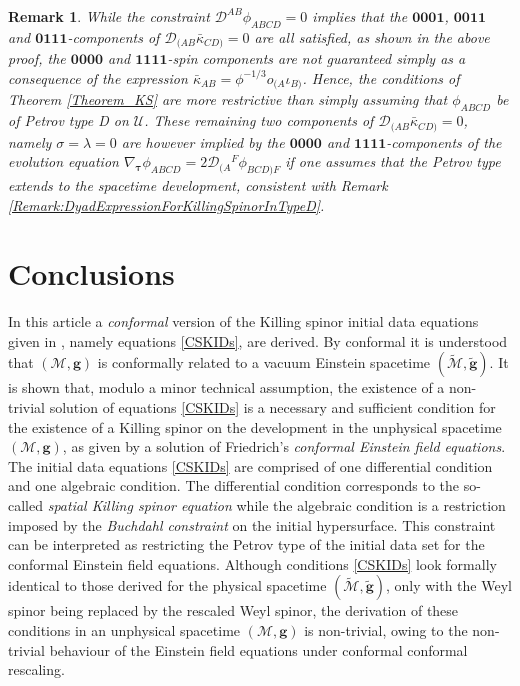 \documentclass[10pt,a4paper]{article}
\theoremstyle{plain}
\newtheorem{remark}{Remark}
\def\bmg{{\bm g}}
\begin{document}
\begin{remark}{\em 
 While the constraint $\mathcal{D}^{AB}\phi_{ABCD}=0$ implies that the
 $\bm0\bm0\bm0\bm1$, $\bm0\bm0\bm1\bm1$ and
 $\bm0\bm1\bm1\bm1$-components of
 $\mathcal{D}_{(AB}\bar{\kappa}_{CD)}=0$ are all satisfied, as shown
 in the above proof, the $\bm0\bm0\bm0\bm0$ and
 $\bm1\bm1\bm1\bm1$-spin components are not guaranteed simply as a
 consequence of the expression
 $\bar{\kappa}_{AB}=\phi^{-1/3}o_{(A}\iota_{B)}$. Hence, the
 conditions of Theorem \ref{Theorem_KS} are more restrictive than
 simply assuming that $\phi_{ABCD}$ be of Petrov type D on
 $\mathcal{U}$. These remaining two components of
 $\mathcal{D}_{(AB}\bar{\kappa}_{CD)}=0$, namely $\sigma=\lambda=0$ are however implied by the
 $\bm0\bm0\bm0\bm0$ and $\bm1\bm1\bm1\bm1$-components of the
 \emph{evolution equation}
 $\nabla_{\bm\tau}\phi_{ABCD}=2\mathcal{D}_{(A}{}^F\phi_{BCD)F}$ if
 one \emph{assumes} that the Petrov type extends to the spacetime
 development, consistent with Remark
 \ref{Remark:DyadExpressionForKillingSpinorInTypeD}.}
\end{remark}


\section*{Conclusions}

In this article a \emph{conformal} version of the Killing spinor
initial data equations given in \cite{GarVal08c}, namely equations \eqref{CSKIDs}, are derived. By
conformal it is understood that $(\mathcal{M},\bmg)$ is conformally
related to a vacuum Einstein spacetime $(\tilde{\mathcal{M}},\tilde{\bmg})$.
It is shown that, modulo a minor technical assumption, the existence of a non-trivial solution of equations
\eqref{CSKIDs} is a necessary and sufficient
condition for the existence of a Killing spinor on the development in
the unphysical spacetime $(\mathcal{M},\bmg)$, as given by a solution of Friedrich's
\emph{conformal Einstein field equations}.
  The initial data equations \eqref{CSKIDs} are comprised of one differential condition and one
  algebraic condition.  The differential condition corresponds to the
  so-called \emph{spatial Killing spinor equation} while the algebraic
  condition is a restriction imposed by the \emph{Buchdahl constraint} on the initial
  hypersurface. This constraint can be interpreted as restricting the Petrov type
  of the initial data set for the conformal Einstein field equations.
  Although conditions \eqref{CSKIDs} look formally
  identical to those derived for the physical spacetime
  $(\tilde{\mathcal{M}},\tilde{\bmg})$, only with the Weyl spinor being replaced by the rescaled Weyl spinor, the derivation of these
  conditions in an unphysical spacetime
  $(\mathcal{M},\bmg)$ is non-trivial, owing to the non-trivial behaviour of the Einstein field equations under conformal conformal rescaling.  
  \medskip
\end{document}
